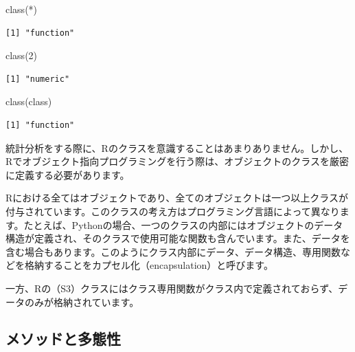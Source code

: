 \documentclass[
  a4paper,
  pandoc,
  ja=standard,
  jafont=haranoaji]{bxjsbook}
\newenvironment{Shaded}{\begin{snugshade}}{\end{snugshade}}
\newcommand{\AttributeTok}[1]{\textcolor[rgb]{0.00,0.48,0.65}{#1}}
\newcommand{\DecValTok}[1]{\textcolor[rgb]{0.68,0.00,0.00}{#1}}
\newcommand{\FunctionTok}[1]{\textcolor[rgb]{0.28,0.35,0.67}{#1}}
\newcommand{\NormalTok}[1]{\textcolor[rgb]{0.00,0.48,0.65}{#1}}
\newcommand{\StringTok}[1]{\textcolor[rgb]{0.13,0.47,0.30}{#1}}
\begin{document}
\begin{Shaded}
\begin{Highlighting}[numbers=left,,]
\FunctionTok{class}\NormalTok{(}\StringTok{\textasciigrave{}}\AttributeTok{*}\StringTok{\textasciigrave{}}\NormalTok{)}
\end{Highlighting}
\end{Shaded}

\begin{verbatim}
[1] "function"
\end{verbatim}

\begin{Shaded}
\begin{Highlighting}[numbers=left,,]
\FunctionTok{class}\NormalTok{(}\DecValTok{2}\NormalTok{)}
\end{Highlighting}
\end{Shaded}

\begin{verbatim}
[1] "numeric"
\end{verbatim}

\begin{Shaded}
\begin{Highlighting}[numbers=left,,]
\FunctionTok{class}\NormalTok{(class)}
\end{Highlighting}
\end{Shaded}

\begin{verbatim}
[1] "function"
\end{verbatim}

統計分析をする際に、Rのクラスを意識することはあまりありません。しかし、Rでオブジェクト指向プログラミングを行う際は、オブジェクトのクラスを厳密に定義する必要があります。

Rにおける全てはオブジェクトであり、全てのオブジェクトは一つ以上クラスが付与されています。このクラスの考え方はプログラミング言語によって異なります。たとえば、Pythonの場合、一つのクラスの内部にはオブジェクトのデータ構造が定義され、そのクラスで使用可能な関数も含んでいます。また、データを含む場合もあります。このようにクラス内部にデータ、データ構造、専用関数などを格納することをカプセル化（encapsulation）と呼びます。

一方、Rの（S3）クラスにはクラス専用関数がクラス内で定義されておらず、データのみが格納されています。

\hypertarget{ux30e1ux30bdux30c3ux30c9ux3068ux591aux614bux6027}{%
\subsection{メソッドと多態性}\label{ux30e1ux30bdux30c3ux30c9ux3068ux591aux614bux6027}}
\end{document}
